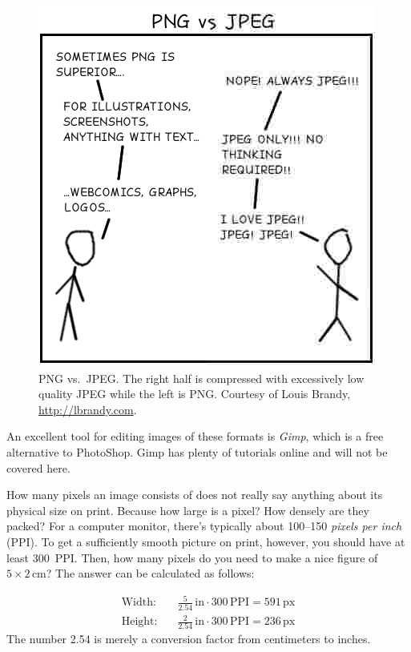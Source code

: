 {\begin{figure}
	\centering
	\includegraphics[scale=1,resolution=150]{graphics/jpg_vs_png.png}
	\caption{PNG vs.\ JPEG. The right half is compressed with excessively low quality JPEG while the left is PNG. Courtesy of Louis Brandy, \url{http://lbrandy.com}.}
	\label{fig:latex:pngjpeg}
\end{figure}

An excellent tool for editing images of these formats is \emph{Gimp}, which is a free alternative to PhotoShop. Gimp has plenty of tutorials online and will not be covered here.

How many pixels an image consists of does not really say anything about its physical size on print. Because how large is a pixel? How densely are they packed? For a computer monitor, there's typically about 100--150 \emph{pixels per inch} (PPI). To get a sufficiently smooth picture on print, however, you should have at least 300~PPI. Then, how many pixels do you need to make a nice figure of $5\times 2\,\mathrm{cm}$? The answer can be calculated as follows:

\begin{align}
	\text{Width:}\quad	&	\frac{5}{2.54}\,\mathrm{in}\cdot 300\,\mathrm{PPI}=591\,\mathrm{px}	\\
	\text{Height:}\quad	&	\frac{2}{2.54}\,\mathrm{in}\cdot 300\,\mathrm{PPI}=236\,\mathrm{px}
\end{align}
The number 2.54 is merely a conversion factor from centimeters to inches.

}
